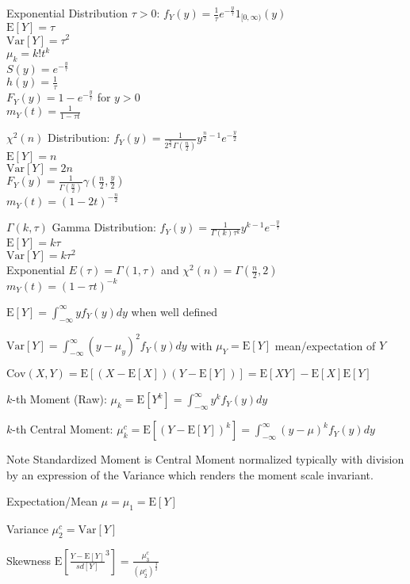 Exponential Distribution $\tau>0$: $f_Y(y)=\frac{1}{\tau}e^{-\frac{y}{\tau}}1_{[0,\infty)}(y)$ \\
$\text{E}[Y]=\tau$ \\
$\text{Var}[Y]=\tau^2$ \\
$\mu_k=k! t^k$ \\
$S(y)=e^{-\frac{y}{\tau}}$ \\
$h(y)=\frac{1}{\tau}$ \\
$F_Y(y)=1-e^{-\frac{y}{\tau}}$ for $y>0$ \\
$m_Y(t)=\frac{1}{1-\tau t}$

$\chi^2 (n)$ Distribution: $f_Y(y)=\frac{1}{2^{\frac{n}{2}} \Gamma (\frac{n}{2})} y^{\frac{n}{2}-1} e^{-\frac{y}{2}}$ \\
$\text{E}[Y]=n$ \\
$\text{Var}[Y]=2n$ \\
$F_Y(y)=\frac{1}{\Gamma (\frac{n}{2})} \gamma (\frac{n}{2},\frac{y}{2})$ \\
$m_Y(t)=(1-2t)^{-\frac{n}{2}}$

$\Gamma (k,\tau)$ Gamma Distribution: $f_Y(y)=\frac{1}{\Gamma (k) \tau^k} y^{k-1} e^{-\frac{y}{\tau}}$ \\
$\text{E}[Y]=k\tau$ \\
$\text{Var}[Y]=k\tau^2$ \\
Exponential $E(\tau)=\Gamma (1,\tau)$ and $\chi^2 (n)=\Gamma (\frac{n}{2},2)$ \\
$m_Y(t)=(1-\tau t)^{-k}$

$\text{E}[Y]=\int_{-\infty}^{\infty} yf_Y(y)dy$ when well defined

$\text{Var}[Y]=\int_{-\infty}^{\infty} (y-\mu_y)^2f_Y(y)dy$ with $\mu_Y=\text{E}[Y]$ mean/expectation of $Y$

$\text{Cov}(X,Y)=\text{E}[(X-\text{E}[X])(Y-\text{E}[Y])]=\text{E}[XY]-\text{E}[X]\text{E}[Y]$

$k$-th Moment (Raw): $\mu_k=\text{E}[Y^k]=\int_{-\infty}^{\infty}y^kf_Y(y)dy$

$k$-th Central Moment: $\mu_k^c=\text{E}[(Y-\text{E}[Y])^k]=\int_{-\infty}^{\infty}(y-\mu)^kf_Y(y)dy$

Note Standardized Moment is Central Moment normalized typically with division by an expression of the Variance which renders the moment scale invariant.

Expectation/Mean $\mu=\mu_1=\text{E}[Y]$

Variance $\mu_2^c=\text{Var}[Y]$

Skewness $\text{E}[\frac{Y-\text{E}[Y]}{sd[Y]}^3]=\frac{\mu_3^c}{(\mu_2^c)^{\frac{3}{2}}}$

